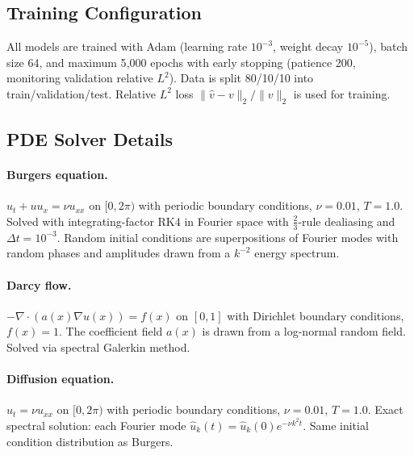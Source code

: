 \documentclass[11pt]{article}
\begin{document}
\subsection{Training Configuration}
All models are trained with Adam (learning rate $10^{-3}$, weight decay
$10^{-5}$), batch size 64, and maximum 5{,}000 epochs with early
stopping (patience 200, monitoring validation relative $L^2$). Data is
split 80/10/10 into train/validation/test. Relative $L^2$ loss
$\|\hat{v} - v\|_2 / \|v\|_2$ is used for training.

\subsection{PDE Solver Details}

\paragraph{Burgers equation.}
$u_t + u u_x = \nu u_{xx}$ on $[0, 2\pi)$ with periodic boundary
conditions, $\nu = 0.01$, $T = 1.0$. Solved with integrating-factor
RK4 in Fourier space with $\frac{2}{3}$-rule dealiasing and
$\Delta t = 10^{-3}$. Random initial conditions are superpositions of
Fourier modes with random phases and amplitudes drawn from a $k^{-2}$
energy spectrum.

\paragraph{Darcy flow.}
$-\nabla \cdot (a(x) \nabla u(x)) = f(x)$ on $[0, 1]$ with Dirichlet
boundary conditions, $f(x) = 1$. The coefficient field $a(x)$ is drawn
from a log-normal random field. Solved via spectral Galerkin method.

\paragraph{Diffusion equation.}
$u_t = \nu u_{xx}$ on $[0, 2\pi)$ with periodic boundary conditions,
$\nu = 0.01$, $T = 1.0$. Exact spectral solution: each Fourier mode
$\hat{u}_k(t) = \hat{u}_k(0) e^{-\nu k^2 t}$. Same initial condition
distribution as Burgers.
\end{document}
